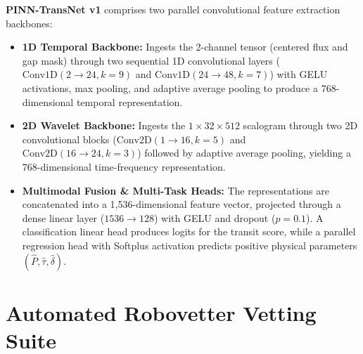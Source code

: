 \documentclass[11pt,a4paper]{article}
\begin{document}
\textbf{PINN-TransNet v1} comprises two parallel convolutional feature extraction backbones:
\begin{itemize}
    \item \textbf{1D Temporal Backbone:} Ingests the 2-channel tensor (centered flux and gap mask) through two sequential 1D convolutional layers ($\text{Conv1D}(2 \to 24, k=9)$ and $\text{Conv1D}(24 \to 48, k=7)$) with GELU activations, max pooling, and adaptive average pooling to produce a 768-dimensional temporal representation.
    \item \textbf{2D Wavelet Backbone:} Ingests the $1 \times 32 \times 512$ scalogram through two 2D convolutional blocks ($\text{Conv2D}(1 \to 16, k=5)$ and $\text{Conv2D}(16 \to 24, k=3)$) followed by adaptive average pooling, yielding a 768-dimensional time-frequency representation.
    \item \textbf{Multimodal Fusion \& Multi-Task Heads:} The representations are concatenated into a 1,536-dimensional feature vector, projected through a dense linear layer ($1536 \to 128$) with GELU and dropout ($p=0.1$). A classification linear head produces logits for the transit score, while a parallel regression head with Softplus activation predicts positive physical parameters $(\hat{P}, \hat{\tau}, \hat{\delta})$.
\end{itemize}

\section{Automated Robovetter Vetting Suite}
\end{document}
